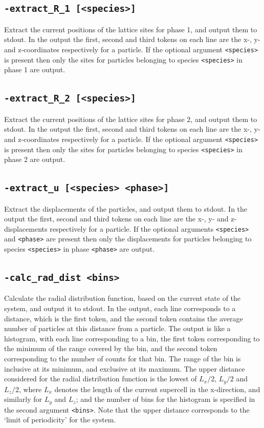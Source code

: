 \documentclass{report}
\begin{document}
\subsection{\texttt{-extract\_R\_1 [<species>]}}
Extract the current positions of the lattice sites for phase 1, and output them to stdout. In the output the first, second and third 
tokens on each line are the x-, y- and z-coordinates respectively for a particle. If the optional argument \texttt{<species>} is present 
then only the sites for particles belonging to species \texttt{<species>} in phase 1 are output.

\subsection{\texttt{-extract\_R\_2 [<species>]}}
Extract the current positions of the lattice sites for phase 2, and output them to stdout. In the output the first, second and third 
tokens on each line are the x-, y- and z-coordinates respectively for a particle. If the optional argument \texttt{<species>} is present 
then only the sites for particles belonging to species \texttt{<species>} in phase 2 are output.

\subsection{\texttt{-extract\_u [<species> <phase>]}}
Extract the displacements of the particles, and output them to stdout. In the output the first, second and third tokens on each line are 
the x-, y- and z-displacements respectively for a particle. If the optional arguments \texttt{<species>} and \texttt{<phase>} are present 
then only the displacements for particles belonging to species \texttt{<species>} in phase \texttt{<phase>} are output.

\subsection{\texttt{-calc\_rad\_dist <bins>}}
Calculate the radial distribution function, based on the current state of the system, and output it to stdout. In the output, each line corresponds 
to a distance, which is the first token, and the second token contains the average number of particles at this distance from a particle. The 
output is like a histogram, with each line corresponding to a bin, the first token corresponding to the minimum of the range covered by the 
bin, and the second token corresponding to the number of counts for that bin. The range of the bin is inclusive at its minimum, and 
exclusive at its maximum. The upper distance considered for the radial distribution function is the lowest of $L_x/2$, $L_y/2$ and $L_z/2$,
where $L_x$ denotes the length of the current supercell in the x-direction, and similarly for $L_y$ and $L_z$; and the number of bins for 
the histogram is specified in the second argument \texttt{<bins>}. Note that the upper distance corresponds to the `limit of periodicity' for the system. 
\end{document}
